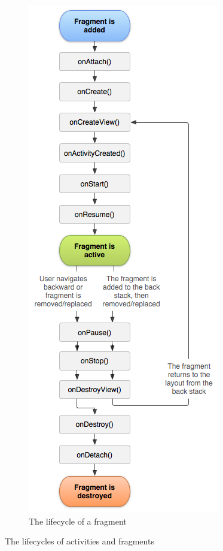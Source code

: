 \begin{figure}[H]
\begin{subfigure}[b]{0.3\textwidth}
      \includegraphics[width=\linewidth]{images/fragment_lifecycle.png}
      \caption[The lifecycle of a fragment \protect{}]{The lifecycle of a fragment}
    \label{fig:fragment_lifecycle}
    \end{subfigure}
  \caption{The lifecycles of activities and fragments}
\end{figure}

